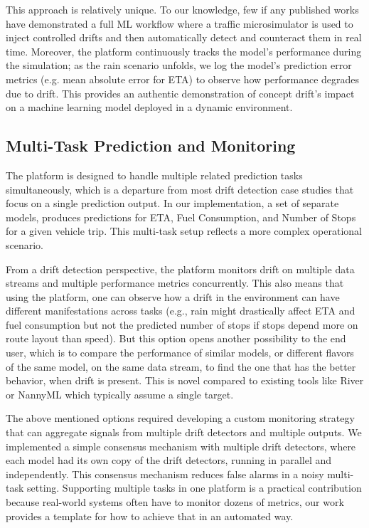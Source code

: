This approach is relatively unique. To our knowledge, few if any published works have demonstrated a full ML workflow where a traffic microsimulator is used to inject controlled drifts and then automatically detect and counteract them in real time.
Moreover, the platform continuously tracks the model's performance during the simulation; as the rain scenario unfolds, we log the model's prediction error metrics (e.g. mean absolute error for ETA) to observe how performance degrades due to drift.
This provides an authentic demonstration of concept drift's impact on a machine learning model deployed in a dynamic environment.

\subsection{Multi-Task Prediction and Monitoring}
The platform is designed to handle multiple related prediction tasks simultaneously, which is a departure from most drift detection case studies that focus on a single prediction output.
In our implementation, a set of separate models, produces predictions for ETA, Fuel Consumption, and Number of Stops for a given vehicle trip.
This multi-task setup reflects a more complex operational scenario.

From a drift detection perspective, the platform monitors drift on multiple data streams and multiple performance metrics concurrently.
This also means that using the platform, one can observe how a drift in the environment can have different manifestations across tasks (e.g., rain might drastically affect ETA and fuel consumption but not the predicted number of stops if stops depend more on route layout than speed).
But this option opens another possibility to the end user, which is to compare the performance of similar models, or different flavors of the same model, on the same data stream, to find the one that has the better behavior, when drift is present.
This is novel compared to existing tools like River or NannyML which typically assume a single target.

The above mentioned options required developing a custom monitoring strategy that can aggregate signals from multiple drift detectors and multiple outputs.
We implemented a simple consensus mechanism with multiple drift detectors, where each model had its own copy of the drift detectors, running in parallel and independently.
This consensus mechanism reduces false alarms in a noisy multi-task setting.
Supporting multiple tasks in one platform is a practical contribution because real-world systems often have to monitor dozens of metrics, our work provides a template for how to achieve that in an automated way.

